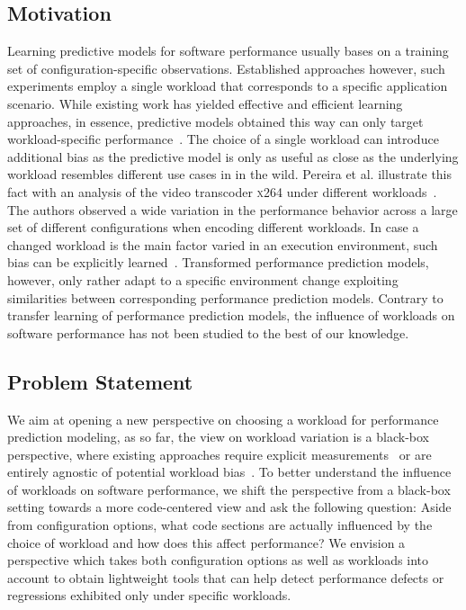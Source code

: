 \documentclass[conference]{IEEEtran}
\begin{document}
\subsection{Motivation}
Learning predictive models for software performance usually bases on a training set of configuration-specific observations. Established approaches however, such experiments employ a single workload that corresponds to a specific application scenario. While existing work has yielded effective and efficient learning approaches, in essence, predictive models obtained this way can only target workload-specific performance~\cite{siegmund_performance-influence_2015,haDeepPerf2019,guoVariabilityawarePerformancePrediction2013,guo_2018_data,sarkarCostEfficientSamplingPerformance}. The choice of a single workload can introduce additional bias as the predictive model is only as useful as close as the underlying workload resembles different use cases in in the wild. Pereira et al. illustrate this fact with an analysis of the video transcoder \textsc{x264} under different workloads~\cite{alves_sampling_2020}. The authors observed a wide variation in the performance behavior across a large set of different configurations when encoding different workloads. In case a changed workload is the main factor varied in an execution environment, such bias can be explicitly learned~\cite{jamishidi_transfer_2017,jamshidi_learning_2018,jamshidi_transfer_gp_2017,ding_bayesian_2020}. Transformed performance prediction models, however, only rather adapt to a specific environment change exploiting similarities between corresponding performance prediction models. Contrary to transfer learning of performance prediction models, the influence of workloads on software performance has not been studied to the best of our knowledge. 

\subsection{Problem Statement}
We aim at opening a new perspective on choosing a workload for performance prediction modeling, as so far, the view on workload variation is a black-box perspective, where existing approaches require explicit measurements~\cite{jamishidi_transfer_2017,jamshidi_learning_2018,jamshidi_transfer_gp_2017} or are entirely agnostic of potential workload bias~\cite{liao_2020_using_emse}. To better understand the influence of workloads on software performance, we shift the perspective from a black-box setting towards a more code-centered view and ask the following question: Aside from configuration options, what code sections are actually influenced by the choice of workload and how does this affect performance? We envision a perspective which takes both configuration options as well as workloads into account to obtain lightweight tools that can help detect performance defects or regressions exhibited only under specific workloads. 
\end{document}
